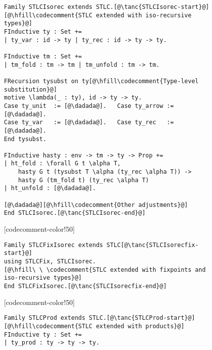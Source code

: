 \begin{figure}

\begin{minipage}{\textwidth}
\begin{multicols}{2}


\begin{lstlisting}
Family STLCIsorec extends STLC.[@\tanc{STLCIsorec-start}@]
[@\hfill\codecomment{STLC extended with iso-recursive types}@]
FInductive ty : Set +=
| ty_var : id -> ty | ty_rec : id -> ty -> ty.

FInductive tm : Set +=
| tm_fold : tm -> tm | tm_unfold : tm -> tm.

FRecursion tysubst on ty[@\hfill\codecomment{Type-level substitution}@]
motive \lambda(_ : ty), id -> ty -> ty.
Case ty_unit  := [@\dadada@].   Case ty_arrow := [@\dadada@].
Case ty_var   := [@\dadada@].   Case ty_rec   := [@\dadada@].
End tysubst.

FInductive hasty : env -> tm -> ty -> Prop +=
| ht_fold : \forall G t \alpha T,
    hasty G t (tysubst T \alpha (ty_rec \alpha T)) ->
    hasty G (tm_fold t) (ty_rec \alpha T)
| ht_unfold : [@\dadada@].

[@\dadada@][@\hfill\codecomment{Other adjustments}@]
End STLCIsorec.[@\tanc{STLCIsorec-end}@]
\end{lstlisting}

[codecomment-color!50]

\vspace{-12pt}


\begin{lstlisting}
Family STLCFixIsorec extends STLC[@\tanc{STLCIsorecfix-start}@]
using STLCFix, STLCIsorec.
[@\hfill\ \ \codecomment{STLC extended with fixpoints and iso-recursive types}@]
End STLCFixIsorec.[@\tanc{STLCIsorecfix-end}@]
\end{lstlisting}

[codecomment-color!50]

\columnbreak


\begin{lstlisting}
Family STLCProd extends STLC.[@\tanc{STLCProd-start}@]
[@\hfill\codecomment{STLC extended with products}@]
FInductive ty : Set +=
| ty_prod : ty -> ty -> ty.


\end{lstlisting}
\end{multicols}
\end{minipage}
\end{figure}
